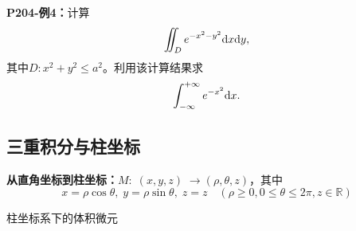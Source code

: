 {\bf P204-例4：}计算
$$\iint_De^{-x^2-y^2}\mathrm{d} x\mathrm{d} y,$$
其中$D:x^2+y^2\leq a^2$。利用该计算结果求
$$\displaystyle\int_{-\infty}^{+\infty}e^{-x^2}\mathrm{d} x.$$

\subsection{三重积分与柱坐标}

{\bf 从直角坐标到柱坐标：}$M:\;(x,y,z)\;\to(\rho,\theta,z)$，其中
$$x=\rho\cos\theta,\;y=\rho\sin\theta,\;z=z\quad (\rho\geq 0,0\leq\theta\leq
2\pi,z\in\mathbb{R})$$

\begin{center}
\end{center}

柱坐标系下的体积微元

